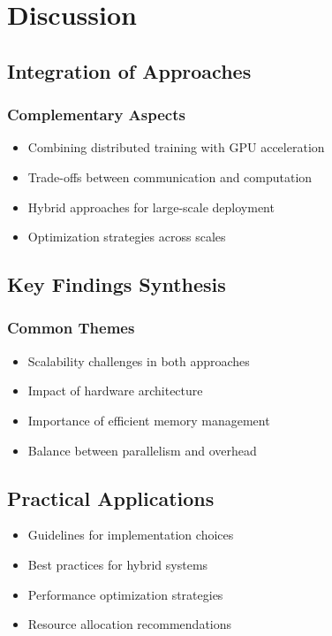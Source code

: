 \section{Discussion}
\label{sec:discussion}

\subsection{Integration of Approaches}
\subsubsection{Complementary Aspects}
\begin{itemize}
    \item Combining distributed training with GPU acceleration
    \item Trade-offs between communication and computation
    \item Hybrid approaches for large-scale deployment
    \item Optimization strategies across scales
\end{itemize}

\subsection{Key Findings Synthesis}
\subsubsection{Common Themes}
\begin{itemize}
    \item Scalability challenges in both approaches
    \item Impact of hardware architecture
    \item Importance of efficient memory management
    \item Balance between parallelism and overhead
\end{itemize}

\subsection{Practical Applications}
\begin{itemize}
    \item Guidelines for implementation choices
    \item Best practices for hybrid systems
    \item Performance optimization strategies
    \item Resource allocation recommendations
\end{itemize}

